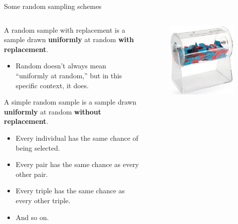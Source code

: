 \documentclass[aspectratio=169]{../latex_main/tntbeamer}  %
\begin{document}
	
		\begin{frame}{Some random sampling schemes}
	    \begin{columns}
	        \begin{column}{.7\textwidth}
	            A \alert{random sample with replacement} is a sample drawn \textbf{uniformly} at random \textbf{with replacement}.

	            \begin{itemize}
	                \item Random doesn’t always mean “uniformly at random,” but in this specific context, it does.
	            \end{itemize}
	            A \alert{simple random sample} is a sample drawn \textbf{uniformly} at random \textbf{without replacement}.
                 \begin{itemize}
	                \item Every individual has the same chance of being selected.
	                \item Every pair has the same chance as every other pair.
	                \item Every triple has the same chance as every other triple.
	                \item And so on.

	            \end{itemize}
	        \end{column}
	        
	        \begin{column}{.3\textwidth}
	            \begin{figure}
	                \centering
	                \includegraphics[scale=.5]{Bild14}
	            \end{figure}

	        \end{column}
	        
	    \end{columns}
	    
	\end{frame}
	
\end{document}
